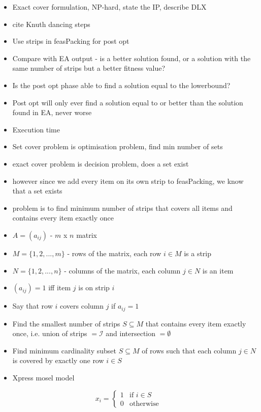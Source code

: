 \documentclass{elsarticle}
\begin{document}
{\color{myGreen}
\begin{itemize}[leftmargin=*]
	\item Exact cover formulation, NP-hard, state the IP, describe DLX
	\item cite Knuth \cite{knuth2000} dancing steps
	\item Use strips in feasPacking for post opt
	\item Compare with EA output - is a better solution found, or a solution with the same number of strips but a better fitness value?
	\item Is the post opt phase able to find a solution equal to the lowerbound?
	\item Post opt will only ever find a solution equal to or better than the solution found in EA, never worse
	\item Execution time
	\item Set cover problem is optimisation problem, find min number of sets
	\item exact cover problem is decision problem, does a set exist
	\item however since we add every item on its own strip to feasPacking, we know that a set exists
	\item problem is to find minimum number of strips that covers all items and contains every item exactly once
	\item $A = (a_{ij})$ - $m$ x $n$ matrix
	\item $M = \{1, 2,..., m\}$ - rows of the matrix, each row $i \in M$ is a strip
	\item $N = \{1, 2,...,n\}$ - columns of the matrix, each column $j \in N$ is an item
	\item $(a_{ij}) = 1$ iff item $j$ is on strip $i$
	\item Say that row $i$ covers column $j$ if $a_{ij} = 1$
	\item Find the smallest number of strips $S \subseteq M$ that contains every item exactly once, i.e. union of strips $= \mathcal{I}$ and intersection $= \emptyset$
	\item Find minimum cardinality subset $S \subseteq M$ of rows such that each column $j \in N$ is covered by exactly one row $i \in S$
	\item Xpress mosel model
\end{itemize}
}

\[x_i =
\begin{cases} 
1 & \text{if } i \in S \\
0 & \text{otherwise} 
\end{cases}
\]
\end{document}
